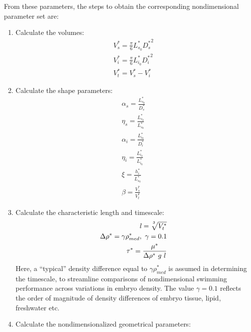 \documentclass[10pt,a4paper]{article}
\def\non{\nonumber}
\def\l{\mathit{l}}
\begin{document}
From these parameters, the steps to obtain the corresponding nondimensional parameter set are:
\begin{enumerate}
	\item Calculate the volumes:
	\begin{eqnarray}\label{d2ndpars2}
		V_s^* = \frac{\pi}{6} L_{s_0}^* {D_s^*}^2 \non \\
		V_i^* = \frac{\pi}{6} L_{i_0}^* {D_i^*}^2 \non \\
		V_t^* = V_s^* - V_i^* 
	\end{eqnarray}
	\item Calculate the shape parameters: %
	\begin{eqnarray}\label{d2ndpars1}
		\alpha_s = \frac{L^*_{s_0}}{D^*_s} \non \\
		\eta_s = \frac{L^*_{s_2}}{L^*_{s_0}} \non \\
		\alpha_{i} = \frac{L^*_{i_0}}{D^*_i} \non \\
		\eta_{i} = \frac{L^*_{i_2}}{L^*_{i_0}} \non \\
		\xi = \frac{h_i^*}{L_{s_0}^*} \non \\
		\beta = \frac{V_s^*}{V_t^*}
	\end{eqnarray}
	\item Calculate the characteristic length and timescale:
	\begin{eqnarray}\label{d2ndpars3}
		\l = \sqrt[\uproot{5}3]{V_t^*} \non \\
		\Delta \rho^* = \gamma \rho_{med}^*, ~ \gamma = 0.1 \non \\
		\tau^* = \frac{\mu^*}{\Delta \rho^* ~ g ~ l}
	\end{eqnarray}
	Here, a ``typical'' density difference equal to $\gamma \rho_{med}^*$ is assumed in determining the timescale, to streamline comparisons of nondimensional swimming performance across variations in embryo density.
	The value $\gamma = 0.1$ reflects the order of magnitude of density differences of embryo tissue, lipid, freshwater etc.
	\item Calculate the nondimensionalized geometrical parameters:

\end{enumerate}
\end{document}
